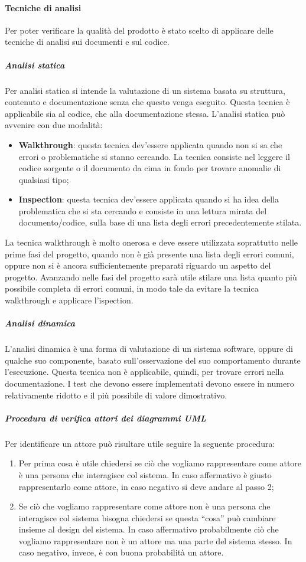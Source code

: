 \documentclass[../NormeProgetto.tex]{subfiles}
\begin{document}
	\paragraph{Tecniche di analisi}
	Per poter verificare la qualità del prodotto è stato scelto di applicare delle tecniche di analisi sui documenti e sul codice. 
		\subparagraph{Analisi statica} Per analisi statica si intende la valutazione di un sistema basata su struttura, contenuto e documentazione senza che questo venga eseguito. Questa tecnica è applicabile sia al codice, che alla documentazione stessa. L'analisi statica può avvenire con due modalità:
		\begin{itemize}
			\item \textbf{Walkthrough}: questa tecnica dev'essere applicata quando non si sa che errori o problematiche si stanno cercando. La tecnica consiste nel leggere il codice sorgente o il documento da cima in fondo per trovare anomalie  di qualsiasi tipo;
			\item \textbf{Inspection}: questa tecnica dev'essere applicata quando si ha idea della problematica che si sta cercando e consiste in una lettura mirata del documento/codice, sulla base di una lista degli errori precedentemente stilata.
		\end{itemize}
		La tecnica walkthrough è molto onerosa e deve essere utilizzata soprattutto nelle prime fasi del progetto, quando non è già presente una lista degli errori comuni, oppure non si è ancora sufficientemente preparati riguardo un aspetto del progetto. Avanzando nelle fasi del progetto sarà utile stilare una lista quanto più possibile completa di errori comuni, in modo tale da evitare la tecnica walkthrough e applicare l'ispection.
		
		\subparagraph{Analisi dinamica}
		L’analisi dinamica è una forma di valutazione di un sistema software, oppure di qualche suo componente, basato sull'osservazione del suo comportamento durante l'esecuzione. Questa tecnica non è applicabile, quindi, per trovare errori nella documentazione. I test che devono essere implementati devono essere in numero relativamente ridotto e il più possibile di valore dimostrativo.
		
		\subparagraph{Procedura di verifica attori dei diagrammi UML}
		Per identificare un attore può risultare utile seguire la seguente procedura:
			\begin{enumerate}
				\item Per prima cosa è utile chiedersi se ciò che vogliamo rappresentare come attore è una persona che interagisce col sistema. In caso affermativo è giusto rappresentarlo come attore, in caso negativo si deve andare al passo 2;
				\item Se ciò che vogliamo rappresentare come attore non è una persona che interagisce col sistema bisogna chiedersi se questa ``cosa'' può cambiare insieme al design del sistema. In caso affermativo probabilmente ciò che vogliamo rappresentare non è un attore ma una parte del sistema stesso. In caso negativo, invece, è con buona probabilità un attore.
			\end{enumerate}
	
\end{document}
